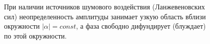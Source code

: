 \begin{figure}
\centering



\caption{При наличии источников шумового воздействия (Ланжевеновских
  сил) неопределенность амплитуды занимает
узкую область вблизи окружности $\left|\alpha\right| = const$, а фаза
свободно дифундирует (блуждает) по этой окружности.}
\label{figPart2Laser2_3}
\end{figure}

